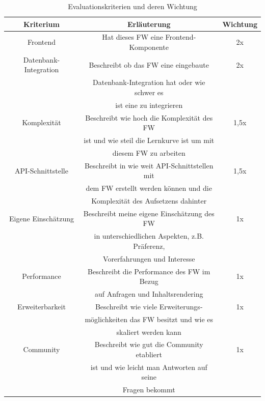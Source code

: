 \documentclass[letterpaper,11pt,leqno]{article}
\begin{document}
\begin{table}[h!]
	\begin{center}
		\begin{tabular}{|c||c|c|}
			\hline
			Kriterium & Erläuterung & Wichtung\\
			\hline\hline
			Frontend & Hat dieses FW eine Frontend-Komponente & 2x\\
			\hline
			Datenbank-Integration & Beschreibt ob das FW eine eingebaute & 2x\\
			& Datenbank-Integration hat oder wie schwer es &\\
			& ist eine zu integrieren &\\
			\hline
			Komplexität & Beschreibt wie hoch die Komplexität des FW & 1,5x\\
			& ist und wie steil die Lernkurve ist um mit &\\
			& diesem FW zu arbeiten &\\
			\hline
			API-Schnittstelle & Beschreibt in wie weit API-Schnittstellen mit & 1,5x\\
			& dem FW erstellt werden können und die &\\
			& Komplexität des Aufsetzens dahinter &\\
			\hline
			Eigene Einschätzung & Beschreibt meine eigene Einschätzung des FW & 1x\\
			& in unterschiedlichen Aspekten, z.B. Präferenz, &\\
			& Vorerfahrungen und Interesse &\\
			\hline
			Performance & Beschreibt die Performance des FW im Bezug & 1x\\
			& auf Anfragen und Inhaltsrendering &\\
			\hline
			Erweiterbarkeit & Beschreibt wie viele Erweiterungs- & 1x\\
			& möglichkeiten das FW besitzt und wie es &\\
			& skaliert werden kann &\\
			\hline
			Community & Beschreibt wie gut die Community etabliert & 1x\\
			& ist und wie leicht man Antworten auf seine &\\
			& Fragen bekommt &\\
			\hline
		\end{tabular}
		\caption{Evaluationskriterien und deren Wichtung}
	\end{center}
	\label{table:1}
\end{table}
\end{document}
